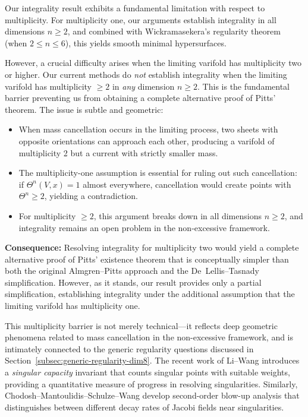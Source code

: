 Our integrality result exhibits a fundamental limitation with respect to multiplicity. For
multiplicity one, our arguments establish integrality in all dimensions $n \geq 2$, and combined
with Wickramasekera's regularity theorem (when $2 \leq n \leq 6$), this yields smooth minimal
hypersurfaces.

However, a crucial difficulty arises when the limiting varifold has multiplicity two or higher. Our
current methods do \emph{not} establish integrality when the limiting varifold has multiplicity
$\geq 2$ in \emph{any} dimension $n \geq 2$. This is the fundamental barrier preventing us from
obtaining a complete alternative proof of Pitts' theorem. The issue is subtle and geometric:

\begin{itemize}
    \item When mass cancellation occurs in the limiting process, two sheets with opposite
    orientations can approach each other, producing a varifold of multiplicity 2 but a current with
    strictly smaller mass.

    \item The multiplicity-one assumption is essential for ruling out such cancellation: if
    $\Theta^n(V,x) = 1$ almost everywhere, cancellation would create points with $\Theta^n \geq 2$,
    yielding a contradiction.

    \item For multiplicity $\geq 2$, this argument breaks down in all dimensions $n \geq 2$, and
    integrality remains an open problem in the non-excessive framework.
\end{itemize}

\textbf{Consequence:} Resolving integrality for multiplicity two would yield a complete alternative
proof of Pitts' existence theorem that is conceptually simpler than both the original
Almgren--Pitts approach and the De~Lellis--Tasnady simplification. However, as it stands, our
result provides only a partial simplification, establishing integrality under the additional
assumption that the limiting varifold has multiplicity one.

This multiplicity barrier is not merely technical---it reflects deep geometric phenomena related to
mass cancellation in the non-excessive framework, and is intimately connected to the generic
regularity questions discussed in Section~\ref{subsec:generic-regularity-dim8}. The recent work of Li--Wang \cite{LiWang-dim8}
introduces a \emph{singular capacity} invariant that counts singular points with suitable weights,
providing a quantitative measure of progress in resolving singularities. Similarly,
Chodosh--Mantoulidis--Schulze--Wang \cite{CMSW-dim11} develop second-order blow-up analysis that
distinguishes between different decay rates of Jacobi fields near singularities.

